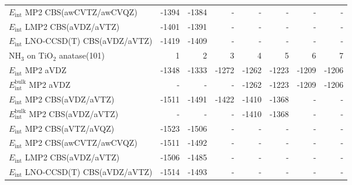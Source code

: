 \begin{longtable}{lrrrrrrr}
$E_\textrm{int}$ MP2 CBS(awCVTZ/awCVQZ) & -1394 & -1384 & - & - & - & - & - \\
$E_\textrm{int}$ LMP2 CBS(aVDZ/aVTZ) & -1401 & -1391 & - & - & - & - & - \\
$E_\textrm{int}$ LNO-CCSD(T) CBS(aVDZ/aVTZ) & -1419 & -1409 & - & - & - & - & - \\
\toprule
NH$_3$ on TiO$_2$ anatase(101) & 1 & 2 & 3 & 4 & 5 & 6 & 7 \\ 
\midrule
$E_\textrm{int}$ MP2 aVDZ & -1348 & -1333 & -1272 & -1262 & -1223 & -1209 & -1206 \\
$E_\textrm{int}^\textrm{bulk}$ MP2 aVDZ & - & - & - & -1262 & -1223 & -1209 & -1206 \\
$E_\textrm{int}$ MP2 CBS(aVDZ/aVTZ) & -1511 & -1491 & -1422 & -1410 & -1368 & - & - \\
$E_\textrm{int}^\textrm{bulk}$ MP2 CBS(aVDZ/aVTZ) & - & - & - & -1410 & -1368 & - & - \\
$E_\textrm{int}$ MP2 CBS(aVTZ/aVQZ) & -1523 & -1506 & - & - & - & - & - \\
$E_\textrm{int}$ MP2 CBS(awCVTZ/awCVQZ) & -1511 & -1492 & - & - & - & - & - \\
$E_\textrm{int}$ LMP2 CBS(aVDZ/aVTZ) & -1506 & -1485 & - & - & - & - & - \\
$E_\textrm{int}$ LNO-CCSD(T) CBS(aVDZ/aVTZ) & -1514 & -1493 & - & - & - & - & - \\
\end{longtable}